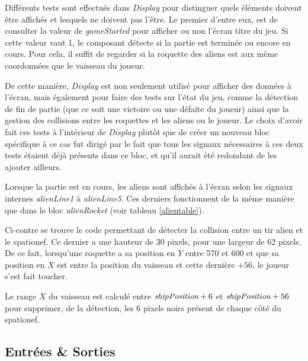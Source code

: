 \documentclass[french]{nakrule}
\begin{document}
Différents tests sont effectués dans \emph{Display} pour distinguer quels éléments
doivent être affichés et lesquels ne doivent pas l'être. Le premier d'entre eux,
est de consulter la valeur de \emph{gameStarted} pour afficher ou non l'écran
titre du jeu. Si cette valeur vaut 1, le composant détecte si la partie est
terminée ou encore en cours. Pour cela, il suffit de regarder si la roquette des
aliens est aux même coordonnées que le vaisseau du joueur.

De cette manière, \emph{Display} est non seulement utilisé pour afficher des
données à l'écran, mais également pour faire des tests sur l'état du jeu, comme
la détection de fin de partie (que ce soit une victoire ou une défaite du
joueur) ainsi que la gestion des collisions entre les roquettes et les aliens ou
le joueur. Le choix d'avoir fait ces tests à l'intérieur de \emph{Display} plutôt
que de créer un nouveau bloc spécifique à ce cas fut dirigé par le fait que
tous les signaux nécessaires à ces deux tests étaient déjà présents dans ce
bloc, et qu'il aurait été redondant de les ajouter ailleurs.

\begin{figure}

\end{figure}

Lorsque la partie est en cours, les aliens sont affichés à l'écran selon les
signaux internes \emph{alienLine1} à \emph{alienLine5}. Ces derniers
fonctionnent de la même manière que dans le bloc \emph{alienRocket} (voir
tableau \ref{alientable}).

Ci-contre se trouve le code permettant de détecter la collision entre un tir
alien et le spationef. Ce dernier a une hauteur de 30 pixels, pour une largeur
de 62 pixels. De ce fait, lorsqu'une roquette a sa position en $Y$ entre 570
et 600 et que sa position en $X$ est entre la position du vaisseau et cette
dernière $+ 56$, le joueur s'est fait toucher.

Le range $X$ du vaisseau est calculé entre $\emph{shipPosition}+6$ et
$\emph{shipPosition}+56$ pour supprimer, de la détection, les 6 pixels noirs
présent de chaque côté du spationef.


\clearpage

\subsection{Entrées \& Sorties}
\label{subsec:Entrees_Sorties_display}
\end{document}
